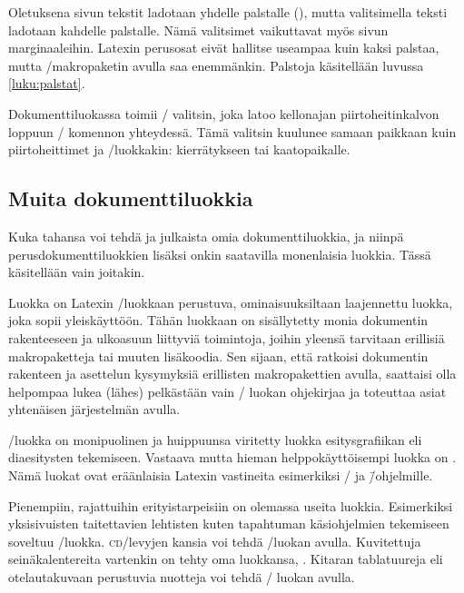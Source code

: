 Oletuksena sivun tekstit ladotaan yhdelle palstalle
(), mutta valitsimella  teksti
ladotaan kahdelle palstalle. Nämä valitsimet vaikuttavat myös sivun
marginaaleihin. Latexin perusosat eivät hallitse useampaa kuin kaksi
palstaa, mutta \-/makropaketin avulla saa enemmänkin.
Palstoja käsitellään luvussa \ref{luku:palstat}.

Dokumenttiluokassa  toimii \-/ valitsin,
joka latoo kellonajan piirtoheitinkalvon loppuun \-/
komennon yhteydessä. Tämä valitsin kuulunee samaan paikkaan kuin
piirtoheittimet ja \-/luokkakin: kierrätykseen tai
kaatopaikalle.

\subsection{Muita dokumenttiluokkia}

Kuka tahansa voi tehdä ja julkaista omia dokumenttiluokkia, ja niinpä
perusdokumenttiluokkien lisäksi onkin saatavilla monenlaisia luokkia.
Tässä käsitellään vain joitakin.

Luokka  on Latexin \-/luokkaan perustuva,
ominaisuuksiltaan laajennettu luokka, joka sopii yleiskäyttöön. Tähän
luokkaan on sisällytetty monia dokumentin rakenteeseen ja ulkoasuun
liittyviä toimintoja, joihin yleensä tarvitaan erillisiä makropaketteja
tai muuten lisäkoodia. Sen sijaan, että ratkoisi dokumentin rakenteen ja
asettelun kysymyksiä erillisten makropakettien avulla, saattaisi olla
helpompaa lukea (lähes) pelkästään vain \-/ luokan
ohjekirjaa ja toteuttaa asiat yhtenäisen järjestelmän avulla.

\-/luokka on monipuolinen ja huippuunsa viritetty luokka
esitysgrafiikan eli diaesitysten tekemiseen. Vastaava mutta hieman
helppokäyttöisempi luokka on . Nämä luokat ovat
eräänlaisia Latexin vastineita esimerkiksi \-/{} ja  \=/ohjelmille.

Pienempiin, rajattuihin erityistarpeisiin on olemassa useita luokkia.
Esimerkiksi yksisivuisten taitettavien lehtisten kuten tapahtuman
käsiohjelmien tekemiseen soveltuu \-/luokka.
\textsc{cd}\-/levyjen kansia voi tehdä \-/luokan avulla.
Kuvitettuja seinäkalentereita vartenkin on tehty oma luokkansa,
. Kitaran tablatuureja eli otelautakuvaan
perustuvia nuotteja voi tehdä \-/ luokan avulla.

